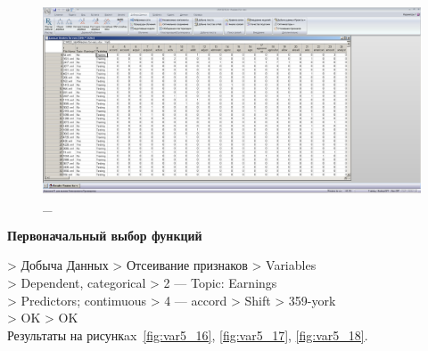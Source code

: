 \begin{figure}[p!h]
  \centering

  \includegraphics[width=17cm]
  {inc/var5/15.PNG}

  \caption{\_}

  \label{fig:var5_15}
\end{figure}

\newpage

\begin{center}
  \textbf{Первоначальный выбор функций}
\end{center}

> Добыча Данных > Отсеивание признаков > Variables \\
> Dependent, categorical > 2 — Topic: Earnings \\
> Predictors; contimuous > 4 — accord > Shift > 359-york \\
> OK > OK \\

Результаты на рисункax~\ref{fig:var5_16}, \ref{fig:var5_17}, \ref{fig:var5_18}.

